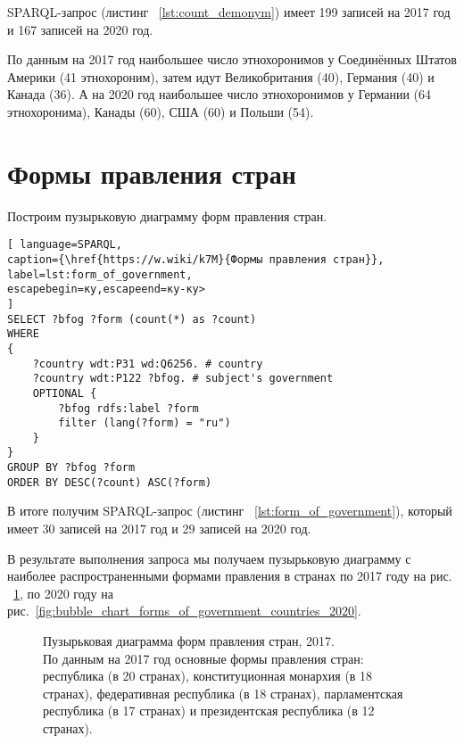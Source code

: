 SPARQL-запрос (листинг ~\ref{lst:count_demonym}) имеет 199 записей на 2017 год и 167 записей на 2020 год.

По данным на 2017 год наибольшее число этнохоронимов у Соединённых Штатов Америки (41 этнохороним), затем идут Великобритания (40), Германия (40) и Канада (36). А на 2020 год наибольшее число этнохоронимов у Германии (64 этнохоронима), Канады (60), США (60) и Польши (54).
\section{Формы правления стран}

Построим пузырьковую диаграмму форм правления стран.


\begin{lstlisting}[ language=SPARQL, 
caption={\href{https://w.wiki/k7M}{Формы правления стран}},
label=lst:form_of_government, 
escapebegin=ку,escapeend=ку-ку>
]
SELECT ?bfog ?form (count(*) as ?count)
WHERE 
{
	?country wdt:P31 wd:Q6256. # country
	?country wdt:P122 ?bfog. # subject's government
	OPTIONAL {
		?bfog rdfs:label ?form
		filter (lang(?form) = "ru")
	}
}
GROUP BY ?bfog ?form
ORDER BY DESC(?count) ASC(?form)
\end{lstlisting}

В итоге получим SPARQL-запрос (листинг ~\ref{lst:form_of_government}), который имеет 30 записей на 2017 год и 29 записей на 2020 год.

В результате выполнения запроса мы получаем пузырьковую диаграмму с наиболее распространенными формами правления в странах по 2017 году на рис. ~\ref{fig:bubble_chart_forms_of_government_countries_2017}, по 2020 году на рис.~\ref{fig:bubble_chart_forms_of_government_countries_2020}.

\begin{figure}
	{
		\setlength{\fboxsep}{0pt}%
		\setlength{\fboxrule}{1pt}%
	}
	\caption{Пузырьковая диаграмма форм правления стран, 2017.
		\\			
		По данным на 2017 год основные формы правления стран: республика (в 20 странах), конституционная монархия (в 18 странах), федеративная республика (в 18 странах), парламентская республика (в 17 странах) и президентская республика (в 12 странах).}%
	\label{fig:bubble_chart_forms_of_government_countries_2017}%
\end{figure}

